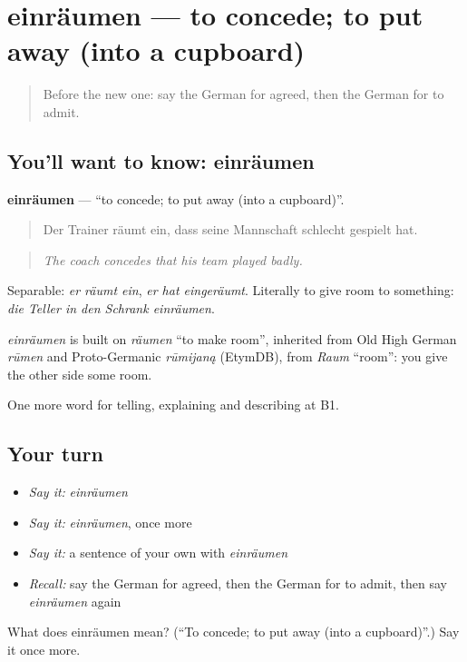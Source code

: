 \section[einräumen]{einräumen — to concede; to put away (into a cupboard)}

\label{lesson:GE-C334-einraeumen}



\begin{quote}
Before the new one: say the German for agreed, then the German for to admit.
\end{quote}

\subsection*{You'll want to know: einräumen}
\textbf{einräumen} — \textquotedblleft{}to concede; to put away (into a cupboard)\textquotedblright{}.

\begin{quote}
Der Trainer räumt ein, dass seine Mannschaft schlecht gespielt hat.
\end{quote}

\begin{quote}
\emph{The coach concedes that his team played badly.}
\end{quote}

Separable: \emph{er räumt ein}, \emph{er hat eingeräumt}. Literally to give room to something: \emph{die Teller in den Schrank einräumen}.

\begin{cousinweb}
\emph{einräumen} is built on \emph{räumen} \textquotedblleft{}to make room\textquotedblright{}, inherited from Old High German \emph{rūmen} and Proto-Germanic \emph{rūmijaną} (EtymDB), from \emph{Raum} \textquotedblleft{}room\textquotedblright{}: you give the other side some room.
\end{cousinweb}

\begin{grammarlens}[title={What you've built}]
One more word for telling, explaining and describing at B1.
\end{grammarlens}

\subsection*{Your turn}
\begin{itemize}
\raggedright
  \item \emph{Say it:} \emph{einräumen}
  \item \emph{Say it:} \emph{einräumen}, once more
  \item \emph{Say it:} a sentence of your own with \emph{einräumen}
  \item \emph{Recall:} say the German for agreed, then the German for to admit, then say \emph{einräumen} again
\end{itemize}

\begin{tcolorbox}[breakable,colback=teal!4,colframe=teal!35!black,title={Before you move on}]
What does einräumen mean? (\textquotedblleft{}To concede; to put away (into a cupboard)\textquotedblright{}.) Say it once more.
\end{tcolorbox}
